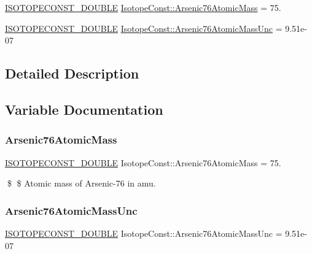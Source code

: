 \begin{DoxyCompactItemize}
\item 
\mbox{\hyperlink{group___isotope_const-_macros_ga8f45a7272ce02c0b4c65c44636ed719a}{I\+S\+O\+T\+O\+P\+E\+C\+O\+N\+S\+T\+\_\+\+D\+O\+U\+B\+LE}} \mbox{\hyperlink{group___isotope_const-_arsenic-_as76_ga81282cb26c685bf68f0b468ab5366cc8}{Isotope\+Const\+::\+Arsenic76\+Atomic\+Mass}} = 75.
\item 
\mbox{\hyperlink{group___isotope_const-_macros_ga8f45a7272ce02c0b4c65c44636ed719a}{I\+S\+O\+T\+O\+P\+E\+C\+O\+N\+S\+T\+\_\+\+D\+O\+U\+B\+LE}} \mbox{\hyperlink{group___isotope_const-_arsenic-_as76_ga63b48cc1ec0f138810144e308b8dae85}{Isotope\+Const\+::\+Arsenic76\+Atomic\+Mass\+Unc}} = 9.\+51e-\/07
\end{DoxyCompactItemize}


\subsection{Detailed Description}


\subsection{Variable Documentation}
\mbox{\label{group___isotope_const-_arsenic-_as76_ga81282cb26c685bf68f0b468ab5366cc8}} 
\subsubsection{\texorpdfstring{Arsenic76\+Atomic\+Mass}{Arsenic76AtomicMass}}
{\footnotesize\ttfamily \mbox{\hyperlink{group___isotope_const-_macros_ga8f45a7272ce02c0b4c65c44636ed719a}{I\+S\+O\+T\+O\+P\+E\+C\+O\+N\+S\+T\+\_\+\+D\+O\+U\+B\+LE}} Isotope\+Const\+::\+Arsenic76\+Atomic\+Mass = 75.}

\$ \$ Atomic mass of Arsenic-\/76 in amu. \mbox{\label{group___isotope_const-_arsenic-_as76_ga63b48cc1ec0f138810144e308b8dae85}} 
\subsubsection{\texorpdfstring{Arsenic76\+Atomic\+Mass\+Unc}{Arsenic76AtomicMassUnc}}
{\footnotesize\ttfamily \mbox{\hyperlink{group___isotope_const-_macros_ga8f45a7272ce02c0b4c65c44636ed719a}{I\+S\+O\+T\+O\+P\+E\+C\+O\+N\+S\+T\+\_\+\+D\+O\+U\+B\+LE}} Isotope\+Const\+::\+Arsenic76\+Atomic\+Mass\+Unc = 9.\+51e-\/07}

